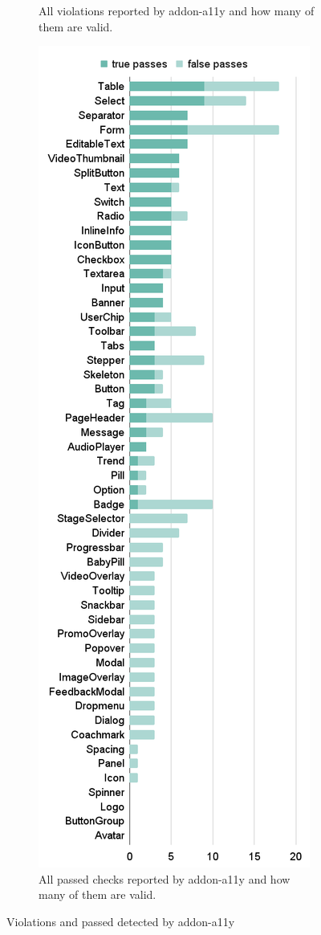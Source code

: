 \documentclass{master_thesis}
\begin{document}
\begin{figure}[H]
\begin{subfigure}{0.46\textwidth}
	\caption{All violations reported by addon-a11y and how many of them are valid.}
	\label{fig:audit-failed}
	\end{subfigure}
	\hspace{0.05\textwidth}
	\begin{subfigure}{0.46\textwidth}
	\includegraphics[width=\textwidth]{img/audit/passed.png}
	\caption{All passed checks reported by addon-a11y and how many of them are valid.}
	\label{fig:audit-passed}
	\end{subfigure}
\caption{Violations and passed detected by addon-a11y}
\label{fig:audit-passed-failed}
\end{figure}
\end{document}
